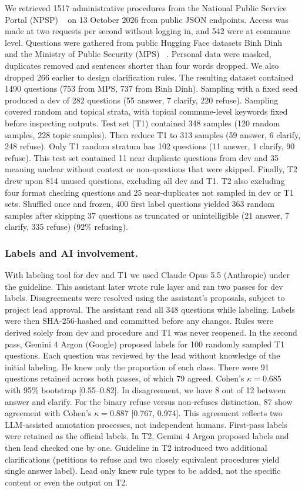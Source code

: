 \documentclass[runningheads]{llncs}
\begin{document}
{We retrieved 1517  administrative procedures from the National Public Service Portal (NPSP) ~\cite{dvcportal} on 13 October 2026 from public JSON endpoints. Access was made at two requests per second without logging in, and 542 were at commune level. Questions were gathered from public Hugging Face datasets Binh Dinh ~\cite{hfdvc} and the Ministry of Public Security (MPS) ~\cite{hfmps}. Personal data were masked, duplicates removed and sentences shorter than four words dropped. We also dropped 266 earlier to design clarification rules. The resulting dataset contained 1490 questions (753 from MPS, 737 from Binh Dinh). Sampling with a fixed seed produced a dev of 282 questions (55 answer, 7 clarify, 220 refuse). Sampling covered random and topical strata, with topical commune-level keywords fixed before inspecting outputs. Test set (T1) contained 348 samples (120 random samples, 228 topic samples). Then reduce T1 to 313 samples (59 answer, 6 clarify, 248 refuse). Only T1 random stratum has 102 questions (11 answer, 1 clarify, 90 refuse). This test set contained 11 near duplicate questions from dev and 35 meaning unclear without context or non-questions that were skipped. Finally, T2 drew upon 814 unused questions, excluding all dev and T1. T2 also excluding four format checking questions and 25 near-duplicates not sampled in dev or T1 sets. Shuffled once and frozen, 400 first label questions yielded 363 random samples after skipping 37 questions as truncated or unintelligible (21 answer, 7 clarify, 335 refuse) (92\% refusing).}

\subsubsection{Labels and AI involvement.}

{With labeling tool for dev and T1 we used Claude Opus 5.5 (Anthropic) under the guideline. This assistant later wrote rule layer and ran two passes for dev labels. Disagreements were resolved using the assistant's proposals, subject to project lead approval. The assistant read all 348 questions while labeling. Labels were then SHA-256-hashed and committed before any changes. Rules were derived solely from dev and procedure and T1 was never reopened. In the second pass, Gemini 4 Argon (Google) proposed labels for 100 randomly sampled T1 questions. Each question was reviewed by the lead without knowledge of the initial labeling. He knew only the proportion of each class. There were 91 questions retained across both passes, of which 79 agreed. Cohen's $\kappa = 0.685$ ~\cite{cohen1960} with  95\% bootstrap [0.55--0.82]. In disagreement, we have 8 out of 12 between answer and clarify. For the binary refuse versus non-refuses distinction, 87 show agreement with Cohen's $\kappa =0.887$ [0.767, 0.974]. This agreement reflects two LLM-assisted annotation processes, not independent humans. First-pass labels were retained as the official labels. In T2, Gemini 4 Argon proposed labels and then lead checked one by one. Guideline in T2 introduced two additional clarifications (petitions to refuse and two closely equivalent procedures yield single answer label). Lead only knew rule types to be added, not the specific content or even the output on T2.}
\end{document}
